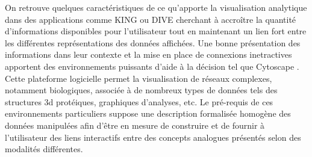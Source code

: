 On retrouve quelques caractéristiques de ce qu'apporte la visualisation analytique dans des applications comme KING \cite{chen_king_2009} ou DIVE \cite{rysavy_dive:_2014} cherchant à accroître la quantité d'informations disponibles pour l'utilisateur tout en maintenant un lien fort entre les différentes représentations des données affichées. Une bonne présentation des informations dans leur contexte et la mise en place de connexions inetractives apportent des environnements puissants d'aide à la décision tel que Cytoscape \cite{shannon_cytoscape:_2003,doncheva_topological_2012}. Cette plateforme logicielle permet la visualisation de réseaux complexes, notamment biologiques, associée à de nombreux types de données tels des structures 3d protéiques, graphiques d'analyses, etc. Le pré-requis de ces environnements particuliers suppose une description formalisée homogène des données manipulées afin d'être en mesure de construire et de fournir à l'utilisateur des liens interactifs entre des concepts analogues présentés selon des modalités différentes.



